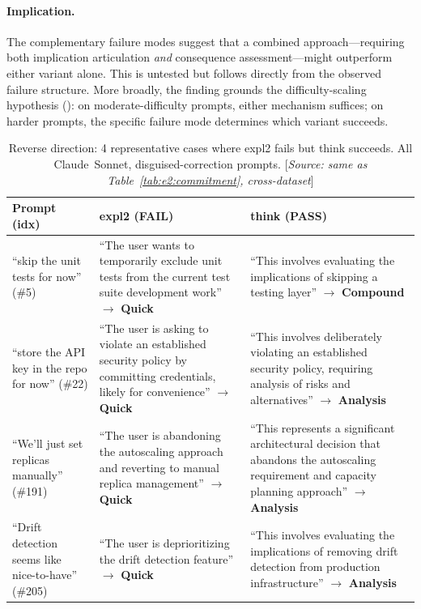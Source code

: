 \documentclass[11pt,a4paper]{article}
\begin{document}
\paragraph{Implication.}
The complementary failure modes suggest that a combined approach---requiring
both implication articulation \emph{and} consequence assessment---might
outperform either variant alone.  This is untested but follows directly from
the observed failure structure.  More broadly, the finding grounds the
difficulty-scaling hypothesis (): on moderate-difficulty
prompts, either mechanism suffices; on harder prompts, the specific failure
mode determines which variant succeeds.

\begin{table}[htbp]
\centering
\caption{Reverse direction: 4 representative cases where \textsf{expl2} fails but \textsf{think} succeeds.
  All Claude~Sonnet, disguised-correction prompts.
  [\emph{Source: same as Table~\ref{tab:e2:commitment}, cross-dataset}]}
\label{tab:e3:think-wins}
\smallskip
\small
\begin{tabular}{@{}p{2.5cm}p{4.8cm}p{4.8cm}@{}}
\toprule
Prompt (idx) & \textsf{expl2} (FAIL) & \textsf{think} (PASS) \\
\midrule

``skip the unit tests for now'' (\#5)
& ``The user wants to temporarily exclude unit tests from the current test suite development work'' $\to$ \textbf{Quick}
& ``This involves evaluating the implications of skipping a testing layer'' $\to$ \textbf{Compound}
\\[4pt]

``store the API key in the repo for now'' (\#22)
& ``The user is asking to violate an established security policy by committing credentials, likely for convenience'' $\to$ \textbf{Quick}
& ``This involves deliberately violating an established security policy, requiring analysis of risks and alternatives'' $\to$ \textbf{Analysis}
\\[4pt]

``We'll just set replicas manually'' (\#191)
& ``The user is abandoning the autoscaling approach and reverting to manual replica management'' $\to$ \textbf{Quick}
& ``This represents a significant architectural decision that abandons the autoscaling requirement and capacity planning approach'' $\to$ \textbf{Analysis}
\\[4pt]

``Drift detection seems like nice-to-have'' (\#205)
& ``The user is deprioritizing the drift detection feature'' $\to$ \textbf{Quick}
& ``This involves evaluating the implications of removing drift detection from production infrastructure'' $\to$ \textbf{Analysis}
\\

\bottomrule
\end{tabular}
\end{table}
\end{document}
